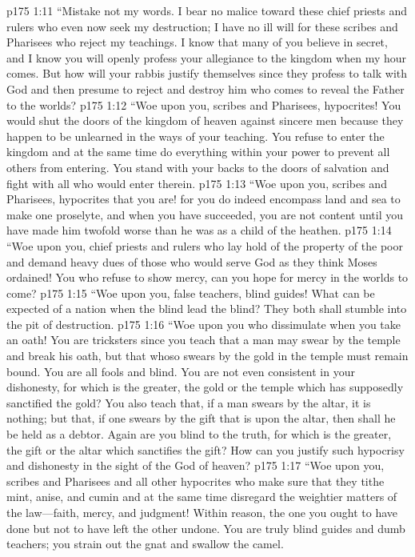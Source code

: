 \vs p175 1:11 \textcolor{ubdarkred}{“Mistake not my words. I bear no malice toward these chief priests and rulers who even now seek my destruction; I have no ill will for these scribes and Pharisees who reject my teachings. I know that many of you believe in secret, and I know you will openly profess your allegiance to the kingdom when my hour comes. But how will your rabbis justify themselves since they profess to talk with God and then presume to reject and destroy him who comes to reveal the Father to the worlds?}
\vs p175 1:12 \textcolor{ubdarkred}{“Woe upon you, scribes and Pharisees, hypocrites! You would shut the doors of the kingdom of heaven against sincere men because they happen to be unlearned in the ways of your teaching. You refuse to enter the kingdom and at the same time do everything within your power to prevent all others from entering. You stand with your backs to the doors of salvation and fight with all who would enter therein.}
\vs p175 1:13 \textcolor{ubdarkred}{“Woe upon you, scribes and Pharisees, hypocrites that you are! for you do indeed encompass land and sea to make one proselyte, and when you have succeeded, you are not content until you have made him twofold worse than he was as a child of the heathen.}
\vs p175 1:14 \textcolor{ubdarkred}{“Woe upon you, chief priests and rulers who lay hold of the property of the poor and demand heavy dues of those who would serve God as they think Moses ordained! You who refuse to show mercy, can you hope for mercy in the worlds to come?}
\vs p175 1:15 \textcolor{ubdarkred}{“Woe upon you, false teachers, blind guides! What can be expected of a nation when the blind lead the blind? They both shall stumble into the pit of destruction.}
\vs p175 1:16 \textcolor{ubdarkred}{“Woe upon you who dissimulate when you take an oath! You are tricksters since you teach that a man may swear by the temple and break his oath, but that whoso swears by the gold in the temple must remain bound. You are all fools and blind. You are not even consistent in your dishonesty, for which is the greater, the gold or the temple which has supposedly sanctified the gold? You also teach that, if a man swears by the altar, it is nothing; but that, if one swears by the gift that is upon the altar, then shall he be held as a debtor. Again are you blind to the truth, for which is the greater, the gift or the altar which sanctifies the gift? How can you justify such hypocrisy and dishonesty in the sight of the God of heaven?}
\vs p175 1:17 \textcolor{ubdarkred}{“Woe upon you, scribes and Pharisees and all other hypocrites who make sure that they tithe mint, anise, and cumin and at the same time disregard the weightier matters of the law---faith, mercy, and judgment! Within reason, the one you ought to have done but not to have left the other undone. You are truly blind guides and dumb teachers; you strain out the gnat and swallow the camel.}
